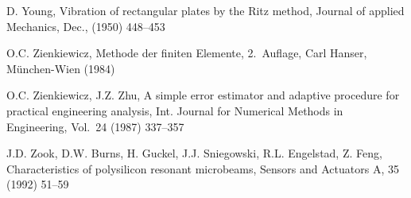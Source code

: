 \begin{thebibliography}{xxx}
 D. Young, Vibration of rectangular plates by the Ritz method, Journal of
 applied Mechanics, Dec., (1950) 448--453



 O.C. Zienkiewicz, Methode der finiten Elemente, 2.~Auflage, Carl Hanser,
 München-Wien (1984)

 O.C. Zienkiewicz, J.Z. Zhu, A simple error estimator and adaptive procedure
 for practical engineering analysis, Int. Journal for Numerical Methods in
 Engineering, Vol.~24 (1987) 337--357

 J.D. Zook, D.W. Burns, H. Guckel, J.J. Sniegowski, R.L. Engelstad, Z. Feng,
 Characteristics of polysilicon resonant microbeams, Sensors and Actuators A,
 35 (1992) 51--59

\end{thebibliography}


